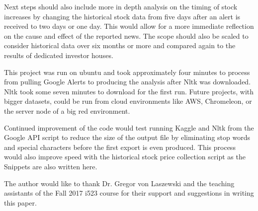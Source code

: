 \documentclass[sigconf]{acmart}
\begin{document}
Next steps should also include more in depth analysis on the timing of stock increases by changing the historical stock data from five days after an alert is received to two days or one day. This would allow for a more immediate reflection on the cause and effect of the reported news. The scope should also be scaled to consider historical data over six months or more and compared again to the results of dedicated investor houses.

This project was run on ubuntu and took approximately four minutes to process from pulling Google Alerts to producing the analysis after Nltk was downloaded. Nltk took some seven minutes to download for the first run. Future projects, with bigger datasets, could be run from cloud environments like AWS, Chromeleon, or the server node of a big red environment. 

Continued improvement of the code would test running Kaggle and Nltk from the Google API script to reduce the size of the output file by eliminating stop words and special characters before the first export is even produced. This process would also improve speed with the historical stock price collection script as the Snippets are also written here.


\begin{acks}

The author would like to thank Dr. Gregor von Laszewski and the teaching assistants of the Fall 2017 i523 course for their support and suggestions in writing this paper. 

\end{acks}


 
\end{document}
